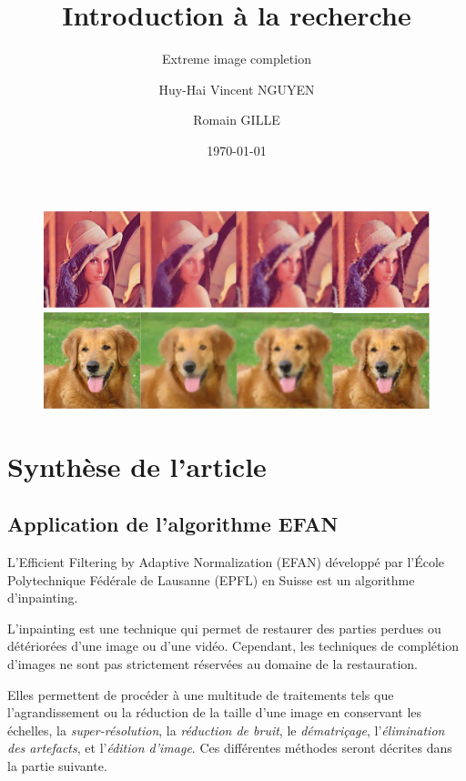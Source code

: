 \documentclass[]{article}
\title{Introduction à la recherche}
\subtitle{Extreme image completion}
\author{Huy-Hai Vincent NGUYEN \and Romain GILLE}
\date{\today}
\begin{document}
\maketitle

\begin{figure}
\centering
\includegraphics{img/comparison_croped.png}
\includegraphics{img/comparison_dog.png}
\end{figure}

\newpage
{
\setcounter{tocdepth}{3}
\tableofcontents
}
\newpage

\hypertarget{synthuxe8se-de-larticle}{%
\section{Synthèse de l'article}\label{synthuxe8se-de-larticle}}

\hypertarget{application-de-lalgorithme-efan}{%
\subsection{Application de l'algorithme
EFAN}\label{application-de-lalgorithme-efan}}

L'Efficient Filtering by Adaptive Normalization (EFAN) développé par
l'École Polytechnique Fédérale de Lausanne (EPFL) en Suisse est un
algorithme d'inpainting.

L'inpainting est une technique qui permet de restaurer des parties
perdues ou détériorées d'une image ou d'une vidéo. Cependant, les
techniques de complétion d'images ne sont pas strictement réservées au
domaine de la restauration.

Elles permettent de procéder à une multitude de traitements tels que
l'agrandissement ou la réduction de la taille d'une image en conservant
les échelles, la \emph{super-résolution}, la \emph{réduction de bruit},
le \emph{dématriçage}, l'\emph{élimination des artefacts}, et
l'\emph{édition d'image}. Ces différentes méthodes seront décrites dans
la partie suivante.
\end{document}
